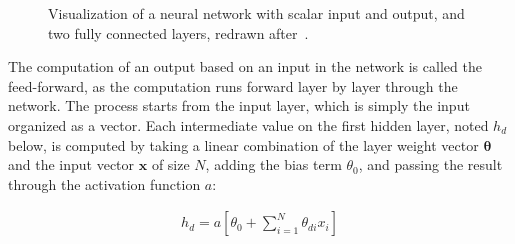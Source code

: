 \documentclass{article}
\begin{document}
\begin{figure}[h]
    \centering
\caption{Visualization of a neural network with scalar input and output, and two fully connected layers, redrawn after~\cite{princebook}.}
\label{image:neuralnet}
\end{figure}


The computation of an output based on an input in the network is called the 
feed-forward, as the computation runs forward layer by layer through the 
network. The process starts from the input layer, which is simply the input 
organized as a vector. Each intermediate value on the first hidden layer, noted $h_d$ below,
is computed by taking a linear combination of the layer weight vector $\mathbf{\theta}$ and 
the input vector $\mathbf{x}$ of size $N$, adding the 
bias term $\theta_0$, and passing the result through the activation function $a$:

\begin{align}
    h_d = a\left[ \theta_{0} + \sum_{i=1}^{N}\theta_{di}x_{i} \right]
\label{eq:fc_layer}
\end{align}
\end{document}
